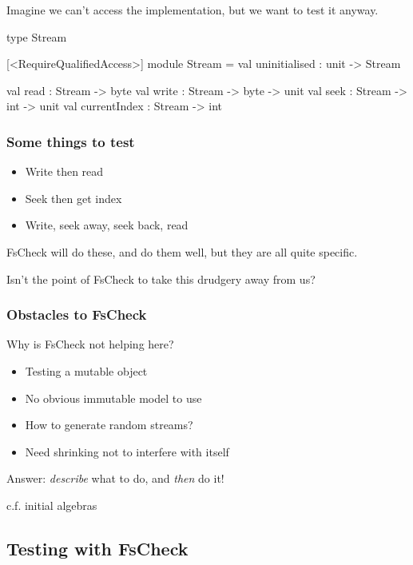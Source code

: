 \documentclass{beamer}
\begin{document}
\begin{frame}[fragile]
Imagine we can't access the implementation, but we want to test it anyway.

\begin{fslisting}
type Stream

[<RequireQualifiedAccess>]
module Stream =
    val uninitialised : unit -> Stream

    val read : Stream -> byte
    val write : Stream -> byte -> unit
    val seek : Stream -> int -> unit
    val currentIndex : Stream -> int
\end{fslisting}
\end{frame}

\begin{frame}
\frametitle{Some things to test}
\begin{itemize}
    \item Write then read
    \item Seek then get index
    \item Write, seek away, seek back, read
\end{itemize}

\hfill \break
FsCheck will do these, and do them well, but they are all quite specific.

Isn't the point of FsCheck to take this drudgery away from us?
\end{frame}

\begin{frame}
\frametitle{Obstacles to FsCheck}

Why is FsCheck not helping here?

\begin{itemize}
    \item Testing a mutable object
    \item No obvious immutable model to use
    \item How to generate random streams?
    \item Need shrinking not to interfere with itself
\end{itemize}
\end{frame}

\begin{frame}
Answer: \emph{describe} what to do, and \emph{then} do it!

\hfill \break

\tiny{c.f. initial algebras}

\end{frame}

\subsection{Testing with FsCheck}
\end{document}
